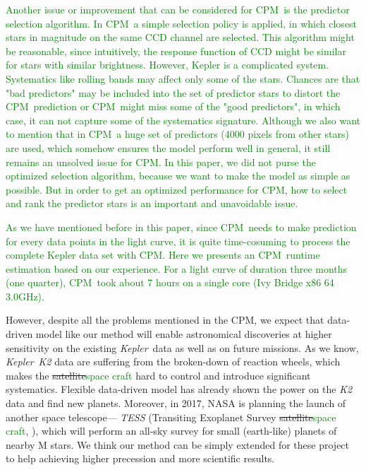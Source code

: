 \documentclass[12pt, preprint]{aastex}
\newcommand{\project}[1]{\textsl{#1}}
\newcommand{\Kepler}{\project{Kepler}}
\newcommand{\name}{CPM}
\newcommand{\revise}[1]{\textcolor{green}{#1}}
\newcommand{\remove}[1]{\sout{#1}}
\begin{document}
\revise{Another issue or improvement that can be considered for \name\ is the predictor selection algorithm. 
In \name\, a simple selection policy is applied, in which closest stars in magnitude on the same CCD channel are selected. This algorithm might be reasonable, since intuitively, the response function of CCD might be similar for stars with similar brightness. 
However, Kepler is a complicated system. Systematics like rolling bands may affect only some of the stars. Chances are that "bad predictors" may be included into the set of predictor stars to distort the \name\ prediction or \name\ might miss some of the "good predictors", in which case, it can not capture some of the systematics signature. Although we also want to mention that in \name\, a huge set of predictors (4000 pixels from other stars) are used, which somehow ensures the model perform well in general, it still remains an unsolved issue for \name.
In this paper, we did not purse the optimized selection algorithm, because we want to make the model as simple as possible. But in order to get an optimized performance for \name, how to select and rank the predictor stars is an important and unavoidable issue.}

\revise{As we have mentioned before in this paper,  since \name\ needs to make prediction for every data points in the light curve, it is quite time-cosuming to process the complete Kepler data set with \name. Here we presents an \name\ runtime estimation based on our experience.  For a light curve of duration three months (one quarter), \name\ took about 7 hours on a single core (Ivy Bridge x86 64 3.0GHz).}

However, despite all the problems mentioned in the \name,
  we expect that data-driven model like our method will enable astronomical discoveries 
  at higher sensitivity on the existing \Kepler\ data as well as on future missions.  
As we know, \Kepler\ \project{K2} \citep{k2} data are suffering from the broken-down of reaction wheels, 
  which makes the \remove{satellite}\revise{space craft} hard to control and introduce significant systematics. 
Flexible data-driven model \citep{dfm} has already shown the power on the \project{K2} data 
  and find new planets.
Moreover, in 2017, NASA is planning the launch of another space telescope---
  \project{TESS} (Transiting Exoplanet Survey \remove{satellite}\revise{space craft}, \cite{tess}), 
  which will perform an all-sky survey for small (earth-like) planets of nearby M stars. 
  We think our method can be simply extended for these project to help achieving higher precession and more scientific results. 
\end{document}
